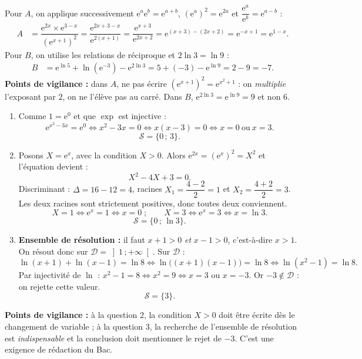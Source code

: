 \documentclass[11pt]{article}
\begin{document}
\begin{corrige}
Pour $A$, on applique successivement $\mathrm{e}^{a}\mathrm{e}^{b} = \mathrm{e}^{a+b}$, $\left(\mathrm{e}^{a}\right)^{2} = \mathrm{e}^{2a}$ et $\dfrac{\mathrm{e}^{a}}{\mathrm{e}^{b}} = \mathrm{e}^{a-b}$ :
\begin{align*}
A &= \dfrac{\mathrm{e}^{2x}\times\mathrm{e}^{3-x}}{\left(\mathrm{e}^{x+1}\right)^{2}}
   = \dfrac{\mathrm{e}^{2x+3-x}}{\mathrm{e}^{2(x+1)}}
   = \dfrac{\mathrm{e}^{x+3}}{\mathrm{e}^{2x+2}}
   = \mathrm{e}^{(x+3)-(2x+2)}
   = \mathrm{e}^{-x+1} = \mathrm{e}^{1-x}.
\end{align*}
Pour $B$, on utilise les relations de réciproque et $2\ln 3 = \ln 9$ :
\begin{align*}
B &= \mathrm{e}^{\ln 5} + \ln\left(\mathrm{e}^{-3}\right) - \mathrm{e}^{2\ln 3}
   = 5 + (-3) - \mathrm{e}^{\ln 9}
   = 2 - 9 = -7.
\end{align*}
\textbf{Points de vigilance :} dans $A$, ne pas écrire $\left(\mathrm{e}^{x+1}\right)^{2} = \mathrm{e}^{x^{2}+1}$ : on \emph{multiplie} l'exposant par $2$, on ne l'élève pas au carré. Dans $B$, $\mathrm{e}^{2\ln 3} = \mathrm{e}^{\ln 9} = 9$ et non $6$.
\end{corrige}

\begin{corrige}
\begin{enumerate}
\item Comme $1 = \mathrm{e}^{0}$ et que $\exp$ est injective :
\[ \mathrm{e}^{x^{2}-3x} = \mathrm{e}^{0} \iff x^{2} - 3x = 0 \iff x(x-3) = 0 \iff x = 0 \ \text{ou}\ x = 3. \]
\[ \mathcal{S} = \{0\,;\,3\}. \]
\item Posons $X = \mathrm{e}^{x}$, avec la condition $X > 0$. Alors $\mathrm{e}^{2x} = \left(\mathrm{e}^{x}\right)^{2} = X^{2}$ et l'équation devient :
\[ X^{2} - 4X + 3 = 0. \]
Discriminant : $\Delta = 16 - 12 = 4$, racines $X_{1} = \dfrac{4-2}{2} = 1$ et $X_{2} = \dfrac{4+2}{2} = 3$. Les deux racines sont strictement positives, donc toutes deux conviennent.
\[ X = 1 \iff \mathrm{e}^{x} = 1 \iff x = 0 \;;\qquad X = 3 \iff \mathrm{e}^{x} = 3 \iff x = \ln 3. \]
\[ \mathcal{S} = \{0\,;\,\ln 3\}. \]
\item \textbf{Ensemble de résolution :} il faut $x+1 > 0$ \emph{et} $x-1 > 0$, c'est-à-dire $x > 1$. On résout donc sur $\mathcal{D} = \left]1\,;+\infty\right[$. Sur $\mathcal{D}$ :
\[ \ln(x+1) + \ln(x-1) = \ln 8 \iff \ln\big((x+1)(x-1)\big) = \ln 8 \iff \ln(x^{2}-1) = \ln 8. \]
Par injectivité de $\ln$ : $x^{2} - 1 = 8 \iff x^{2} = 9 \iff x = 3$ ou $x = -3$. Or $-3 \notin \mathcal{D}$ : on rejette cette valeur.
\[ \mathcal{S} = \{3\}. \]
\end{enumerate}
\textbf{Points de vigilance :} à la question 2, la condition $X > 0$ doit être écrite dès le changement de variable ; à la question 3, la recherche de l'ensemble de résolution est \emph{indispensable} et la conclusion doit mentionner le rejet de $-3$. C'est une exigence de rédaction du Bac.
\end{corrige}
\end{document}
